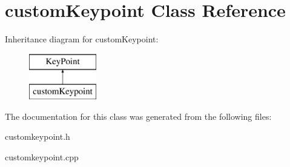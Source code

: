 \hypertarget{classcustom_keypoint}{}\section{custom\+Keypoint Class Reference}
\label{classcustom_keypoint}
Inheritance diagram for custom\+Keypoint\+:\begin{figure}[H]
\begin{center}
\leavevmode
\includegraphics[height=2.000000cm]{classcustom_keypoint}
\end{center}
\end{figure}


The documentation for this class was generated from the following files\+:\begin{DoxyCompactItemize}
\item 
customkeypoint.\+h\item 
customkeypoint.\+cpp\end{DoxyCompactItemize}
